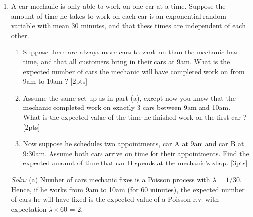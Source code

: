 \documentclass[12pt]{article}
\begin{document}
\begin{enumerate}
\newpage

\item A car mechanic is only able to work on one car at a time.
  Suppose the amount of time he takes to work on each car is an
  exponential random variable with mean 30 minutes, and that these
  times are independent of each other.
\begin{enumerate}
\item Suppose there are always more cars to work on than the mechanic
  has time, and that all customers bring in their cars at 9am. What is
  the expected number of cars the mechanic will have completed work on
  from 9am to 10am ? [2pts]
\item Assume the same set up as in part (a), except now you know that
  the mechanic completed work on exactly 3 cars between 9am and 10am.
  What is the expected value of the time he finished work on the first
  car ? [2pts]
\item Now suppose he schedules two appointments, car A at 9am and car
  B at 9:30am. Assume both cars arrive on time for their appointments.
  Find the expected amount of time that car B spends at the mechanic's
  shop. [3pts]
\end{enumerate}
{\it Soln:} (a) Number of cars mechanic fixes is a Poisson process with $\lambda = 1/30$. Hence, if he works from 9am to 10am (for 60 minutes), the expected number of cars he will have fixed is the expected value of a Poisson r.v. with expectation $\lambda\times 60$ = 2.\\

\end{enumerate}
\end{document}
